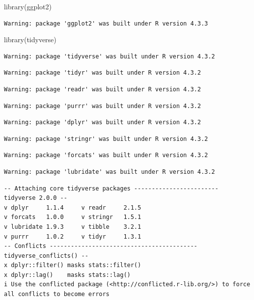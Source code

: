 \documentclass[
  letterpaper,
  DIV=11,
  numbers=noendperiod]{scrartcl}
\newenvironment{Shaded}{\begin{snugshade}}{\end{snugshade}}
\newcommand{\FunctionTok}[1]{\textcolor[rgb]{0.28,0.35,0.67}{#1}}
\newcommand{\NormalTok}[1]{\textcolor[rgb]{0.00,0.23,0.31}{#1}}
\begin{document}
\begin{Shaded}
\begin{Highlighting}[]
\FunctionTok{library}\NormalTok{(ggplot2)}
\end{Highlighting}
\end{Shaded}

\begin{verbatim}
Warning: package 'ggplot2' was built under R version 4.3.3
\end{verbatim}

\begin{Shaded}
\begin{Highlighting}[]
\FunctionTok{library}\NormalTok{(tidyverse)}
\end{Highlighting}
\end{Shaded}

\begin{verbatim}
Warning: package 'tidyverse' was built under R version 4.3.2
\end{verbatim}

\begin{verbatim}
Warning: package 'tidyr' was built under R version 4.3.2
\end{verbatim}

\begin{verbatim}
Warning: package 'readr' was built under R version 4.3.2
\end{verbatim}

\begin{verbatim}
Warning: package 'purrr' was built under R version 4.3.2
\end{verbatim}

\begin{verbatim}
Warning: package 'dplyr' was built under R version 4.3.2
\end{verbatim}

\begin{verbatim}
Warning: package 'stringr' was built under R version 4.3.2
\end{verbatim}

\begin{verbatim}
Warning: package 'forcats' was built under R version 4.3.2
\end{verbatim}

\begin{verbatim}
Warning: package 'lubridate' was built under R version 4.3.2
\end{verbatim}

\begin{verbatim}
-- Attaching core tidyverse packages ------------------------ tidyverse 2.0.0 --
v dplyr     1.1.4     v readr     2.1.5
v forcats   1.0.0     v stringr   1.5.1
v lubridate 1.9.3     v tibble    3.2.1
v purrr     1.0.2     v tidyr     1.3.1
-- Conflicts ------------------------------------------ tidyverse_conflicts() --
x dplyr::filter() masks stats::filter()
x dplyr::lag()    masks stats::lag()
i Use the conflicted package (<http://conflicted.r-lib.org/>) to force all conflicts to become errors
\end{verbatim}
\end{document}

